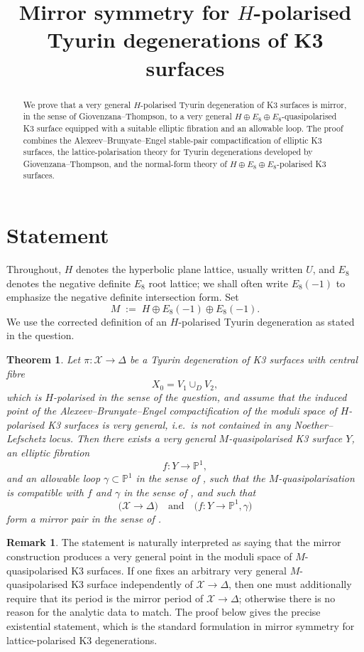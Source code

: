 \documentclass[11pt]{amsart}
\title[Mirror symmetry for $H$-polarised Tyurin degenerations]
{Mirror symmetry for $H$-polarised Tyurin degenerations of K3 surfaces}
\newtheorem{theorem}{Theorem}
\theoremstyle{definition}
\newtheorem{remark}{Remark}
\newcommand{\cX}{\mathcal X}
\newcommand{\bP}{\mathbb P}
\begin{document}
\maketitle

\begin{abstract}
We prove that a very general $H$-polarised Tyurin degeneration of K3 surfaces is mirror, in the sense of Giovenzana--Thompson, to a very general $H\oplus E_8\oplus E_8$-quasipolarised K3 surface equipped with a suitable elliptic fibration and an allowable loop. The proof combines the Alexeev--Brunyate--Engel stable-pair compactification of elliptic K3 surfaces, the lattice-polarisation theory for Tyurin degenerations developed by Giovenzana--Thompson, and the normal-form theory of $H\oplus E_8\oplus E_8$-polarised K3 surfaces.
\end{abstract}

\section{Statement}

Throughout, $H$ denotes the hyperbolic plane lattice, usually written $U$, and $E_8$ denotes the negative definite $E_8$ root lattice; we shall often write $E_8(-1)$ to emphasize the negative definite intersection form. Set
\[
M \;:=\; H\oplus E_8(-1)\oplus E_8(-1).
\]
We use the corrected definition of an $H$-polarised Tyurin degeneration as stated in the question.

\begin{theorem}\label{thm:main}
Let $\pi\colon \cX\to \Delta$ be a Tyurin degeneration of K3 surfaces with central fibre
\[
X_0=V_1\cup_D V_2,
\]
which is $H$-polarised in the sense of the question, and assume that the induced point of the Alexeev--Brunyate--Engel compactification of the moduli space of $H$-polarised K3 surfaces is very general, i.e.\ is not contained in any Noether--Lefschetz locus. Then there exists a very general $M$-quasipolarised K3 surface $Y$, an elliptic fibration
\[
f\colon Y\longrightarrow \bP^1,
\]
and an allowable loop $\gamma\subset \bP^1$ in the sense of \cite[Definition~4.11]{GT24}, such that the $M$-quasipolarisation is compatible with $f$ and $\gamma$ in the sense of \cite[Definition~4.21]{GT24}, and such that
\[
\bigl(\cX\to \Delta\bigr)
\quad\text{and}\quad
\bigl(f\colon Y\to \bP^1,\gamma\bigr)
\]
form a mirror pair in the sense of \cite[Definition~5.1]{GT24}.
\end{theorem}

\begin{remark}
The statement is naturally interpreted as saying that the mirror construction produces a very general point in the moduli space of $M$-quasipolarised K3 surfaces. If one fixes an arbitrary very general $M$-quasipolarised K3 surface independently of $\cX\to\Delta$, then one must additionally require that its period is the mirror period of $\cX\to\Delta$; otherwise there is no reason for the analytic data to match. The proof below gives the precise existential statement, which is the standard formulation in mirror symmetry for lattice-polarised K3 degenerations.
\end{remark}
\end{document}
